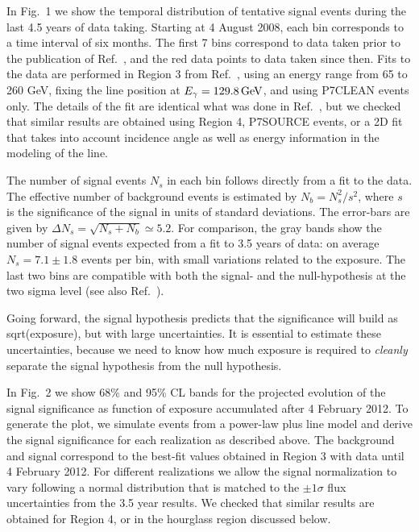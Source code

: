 \documentclass[aps,prd,superscriptaddress,showpacs,nofootinbib,fixlfloat, 12pt]{revtex4-1}
\begin{document}
In Fig.~1 we show the temporal distribution of tentative signal events 
during the last 4.5 years of data taking.
Starting at 4 August 2008, each bin corresponds to a time interval
of six months. The first 7 bins correspond to data taken prior to the
publication of Ref.~\cite{Bringmann:2012}, and the red data points to data taken
since then.  Fits to the data are performed in Region 3 from
Ref.~\cite{Weniger:2012}, using an energy range from 65 to 260 GeV, fixing the
line position at $E_\gamma=129.8\rm\,GeV$, and using P7CLEAN events only. The
details of the fit are identical what was done in Ref.~\cite{Weniger:2012},
but we checked that similar results are obtained using Region 4,
P7SOURCE events, or a 2D fit that takes into account incidence angle as well
as energy information in the modeling of the line. 

The number of signal events $N_s$ in each bin follows directly from a fit to
the data. The effective number of background events is estimated by $N_b =
N_s^2/s^2$, where $s$ is the significance of the signal in units of
standard deviations. The error-bars are
given by $\Delta N_s = \sqrt{N_s+N_b}\simeq5.2$. For comparison, the gray
bands show the number of signal events expected from a fit to 3.5 years of
data: on average $N_s=7.1\pm 1.8$ events per bin, with
small variations related to the exposure. The last two
bins are compatible with both the signal- and the null-hypothesis at the two
sigma level (see also Ref.~\cite{Weniger:2013dya}). \medskip

Going forward, the signal hypothesis predicts that the significance will build
as sqrt(exposure), but with large uncertainties.  It is essential to estimate
these uncertainties, because we need to know how much exposure is required to
\emph{cleanly} separate the signal hypothesis from the null hypothesis. 

In Fig.~2 we show 68\% and 95\% CL bands for the projected evolution of the signal significance as
function of exposure accumulated after 4 February 2012. 
To generate the plot, we simulate events from a
power-law plus line model and derive the signal significance for each
realization as described above. The background and signal correspond to the
best-fit values obtained in Region 3 with data until 4 February 2012.  For
different realizations we allow the signal normalization to vary following a
normal distribution that is matched to the $\pm1\sigma$
flux uncertainties from the 3.5 year results. We checked that similar results
are obtained for Region 4, or in the hourglass region discussed below.
\end{document}

